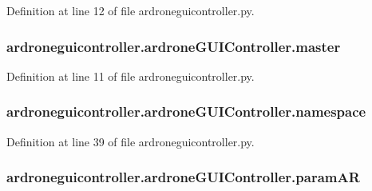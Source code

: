 Definition at line 12 of file ardroneguicontroller.\-py.

\hypertarget{classardroneguicontroller_1_1ardroneGUIController_abdc76d5b11b7c5286a9ee3603d5c87e6}{
\subsubsection[{master}]{\setlength{\rightskip}{0pt plus 5cm}ardroneguicontroller.\-ardrone\-G\-U\-I\-Controller.\-master}}\label{classardroneguicontroller_1_1ardroneGUIController_abdc76d5b11b7c5286a9ee3603d5c87e6}


Definition at line 11 of file ardroneguicontroller.\-py.

\hypertarget{classardroneguicontroller_1_1ardroneGUIController_a5fbc328816571381251655871d86b70e}{
\subsubsection[{namespace}]{\setlength{\rightskip}{0pt plus 5cm}ardroneguicontroller.\-ardrone\-G\-U\-I\-Controller.\-namespace}}\label{classardroneguicontroller_1_1ardroneGUIController_a5fbc328816571381251655871d86b70e}


Definition at line 39 of file ardroneguicontroller.\-py.

\hypertarget{classardroneguicontroller_1_1ardroneGUIController_a7b512aedc151052e8b1d37eb0b729329}{
\subsubsection[{param\-A\-R}]{\setlength{\rightskip}{0pt plus 5cm}ardroneguicontroller.\-ardrone\-G\-U\-I\-Controller.\-param\-A\-R}}\label{classardroneguicontroller_1_1ardroneGUIController_a7b512aedc151052e8b1d37eb0b729329}


